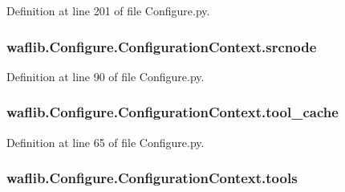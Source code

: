 Definition at line 201 of file Configure.\+py.

\subsubsection[{\texorpdfstring{srcnode}{srcnode}}]{\setlength{\rightskip}{0pt plus 5cm}waflib.\+Configure.\+Configuration\+Context.\+srcnode}\hypertarget{classwaflib_1_1_configure_1_1_configuration_context_ad932bc43b1f9d811a01a4c184c43c6fc}{}\label{classwaflib_1_1_configure_1_1_configuration_context_ad932bc43b1f9d811a01a4c184c43c6fc}


Definition at line 90 of file Configure.\+py.

\subsubsection[{\texorpdfstring{tool\+\_\+cache}{tool_cache}}]{\setlength{\rightskip}{0pt plus 5cm}waflib.\+Configure.\+Configuration\+Context.\+tool\+\_\+cache}\hypertarget{classwaflib_1_1_configure_1_1_configuration_context_a2445499831b4b91b53105cabe67c94af}{}\label{classwaflib_1_1_configure_1_1_configuration_context_a2445499831b4b91b53105cabe67c94af}


Definition at line 65 of file Configure.\+py.

\subsubsection[{\texorpdfstring{tools}{tools}}]{\setlength{\rightskip}{0pt plus 5cm}waflib.\+Configure.\+Configuration\+Context.\+tools}\hypertarget{classwaflib_1_1_configure_1_1_configuration_context_a165ec268f036496bdaf3c00d59dcdef6}{}\label{classwaflib_1_1_configure_1_1_configuration_context_a165ec268f036496bdaf3c00d59dcdef6}


